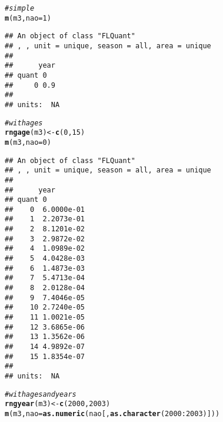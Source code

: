 \documentclass[a4paper,english,10pt]{article}\usepackage[]{graphicx}\usepackage[]{color}
\makeatletter
\newcommand{\hlnum}[1]{\textcolor[rgb]{0.686,0.059,0.569}{#1}}%
\newcommand{\hlcom}[1]{\textcolor[rgb]{0.678,0.584,0.686}{\textit{#1}}}%
\newcommand{\hlopt}[1]{\textcolor[rgb]{0,0,0}{#1}}%
\newcommand{\hlstd}[1]{\textcolor[rgb]{0.345,0.345,0.345}{#1}}%
\newcommand{\hlkwb}[1]{\textcolor[rgb]{0.69,0.353,0.396}{#1}}%
\newcommand{\hlkwc}[1]{\textcolor[rgb]{0.333,0.667,0.333}{#1}}%
\newcommand{\hlkwd}[1]{\textcolor[rgb]{0.737,0.353,0.396}{\textbf{#1}}}%
\newenvironment{kframe}{%
 \def\at@end@of@kframe{}%
 \ifinner\ifhmode%
  \def\at@end@of@kframe{\end{minipage}}%
  \begin{minipage}{\columnwidth}%
 \fi\fi%
 \def\FrameCommand##1{\hskip\@totalleftmargin \hskip-\fboxsep
 \colorbox{shadecolor}{##1}\hskip-\fboxsep
     \hskip-\linewidth \hskip-\@totalleftmargin \hskip\columnwidth}%
 \MakeFramed {\advance\hsize-\width
   \@totalleftmargin\z@ \linewidth\hsize
   \@setminipage}}%
 {\par\unskip\endMakeFramed%
 \at@end@of@kframe}
\newenvironment{knitrout}{}{} %
\makeatother
\begin{document}
\begin{knitrout}
\color{fgcolor}\begin{kframe}
\begin{alltt}
\hlcom{# simple}
\hlkwd{m}\hlstd{(m3,} \hlkwc{nao} \hlstd{=} \hlnum{1}\hlstd{)}
\end{alltt}
\begin{verbatim}
## An object of class "FLQuant"
## , , unit = unique, season = all, area = unique
## 
##      year
## quant 0  
##     0 0.9
## 
## units:  NA
\end{verbatim}
\begin{alltt}
\hlcom{# with ages}
\hlkwd{rngage}\hlstd{(m3)} \hlkwb{<-} \hlkwd{c}\hlstd{(}\hlnum{0}\hlstd{,} \hlnum{15}\hlstd{)}
\hlkwd{m}\hlstd{(m3,} \hlkwc{nao} \hlstd{=} \hlnum{0}\hlstd{)}
\end{alltt}
\begin{verbatim}
## An object of class "FLQuant"
## , , unit = unique, season = all, area = unique
## 
##      year
## quant 0         
##    0  6.0000e-01
##    1  2.2073e-01
##    2  8.1201e-02
##    3  2.9872e-02
##    4  1.0989e-02
##    5  4.0428e-03
##    6  1.4873e-03
##    7  5.4713e-04
##    8  2.0128e-04
##    9  7.4046e-05
##    10 2.7240e-05
##    11 1.0021e-05
##    12 3.6865e-06
##    13 1.3562e-06
##    14 4.9892e-07
##    15 1.8354e-07
## 
## units:  NA
\end{verbatim}
\begin{alltt}
\hlcom{# with ages and years}
\hlkwd{rngyear}\hlstd{(m3)} \hlkwb{<-} \hlkwd{c}\hlstd{(}\hlnum{2000}\hlstd{,} \hlnum{2003}\hlstd{)}
\hlkwd{m}\hlstd{(m3,} \hlkwc{nao} \hlstd{=} \hlkwd{as.numeric}\hlstd{(nao[,} \hlkwd{as.character}\hlstd{(}\hlnum{2000}\hlopt{:}\hlnum{2003}\hlstd{)]))}
\end{alltt}


{\ttfamily\noindent\bfseries\color{errorcolor}{\#\# Error: object 'nao' not found}}\end{kframe}
\end{knitrout}
\end{document}
